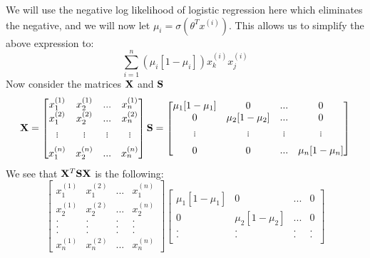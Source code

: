 \documentclass[12pt,letterpaper]{hmcpset}
\begin{document}
\begin{solution}
\begin{enumerate}[(a)]
	    We will use the negative log likelihood of logistic regression here which eliminates the negative, and we will now let $\mu_i = \sigma(\theta^Tx^{(i)})$. This allows us to simplify the above expression to:
	    $$\sum_{i=1}^n (\mu_i[1-\mu_i])x_k^{(i)}x_j^{(i)}$$
	    Now consider the matrices $\Xb$ and $\Sb$
	    $$
	    \Xb = \begin{bmatrix}
        x_1^{(1)} & x_2^{(1)} & ... & x_n^{(1)}  \\%
        x_1^{(2)} & x_2^{(2)} & ... & x_n^{(2)} \\%
        .      &   .    &  .  &  .      \\[-10pt]
        .      &   .    &  .  &  .   \\[-10pt]
        .      &   .    &  .  &  .   \\[5pt]
        x_1^{(n)} & x_2^{(n)} & ... & x_n^{(n)}
        \end{bmatrix}
        \Sb = \begin{bmatrix}
        \mu_1[1-\mu_1] & 0 & ... & 0  \\%
        0 & \mu_2[1-\mu_2] & ... & 0 \\%
        .      &   .    &  .  &  .      \\[-10pt]
        .      &   .    &  .  &  .   \\[-10pt]
        .      &   .    &  .  &  .   \\[5pt]
        0 & 0 & ... & \mu_n[1-\mu_n]
        \end{bmatrix}
	    $$
	    We see that $\Xb^T\Sb\Xb$ is the following:
	    $$
	    \begin{bmatrix}
        x_1^{(1)} & x_1^{(2)} & ... & x_1^{(n)}  \\%
        x_2^{(1)} & x_2^{(2)} & ... & x_2^{(n)} \\%
        .      &   .    &  .  &  .      \\[-10pt]
        .      &   .    &  .  &  .   \\[-10pt]
        .      &   .    &  .  &  .   \\[5pt]
        x_n^{(1)} & x_n^{(2)} & ... & x_n^{(n)}
        \end{bmatrix}
        \begin{bmatrix}
        \mu_1[1-\mu_1] & 0 & ... & 0  \\%
        0 & \mu_2[1-\mu_2] & ... & 0 \\%
        .      &   .    &  .  &  .      \\[-10pt]
        .      &   .    &  .  &  .   \\[-10pt]

\end{bmatrix}$$
\end{enumerate}
\end{solution}
\end{document}
